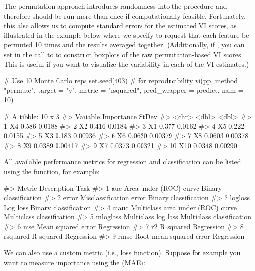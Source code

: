 The permutation approach introduces randomness into the procedure and therefore should be run more than once if computationally feasible. Fortunately, this also allows us to compute standard errors for the estimated VI scores, as illustrated in the example below where we specify  to request that each feature be permuted 10 times and the results averaged together. (Additionally, if , you can set  in the call to  to construct boxplots of the raw permutation-based VI scores. This is useful if you want to visualize the variability in each of the VI estimates.)

\begin{example}
# Use 10 Monte Carlo reps
set.seed(403)  # for reproducibility
vi(pp, method = "permute", target = "y", metric = "rsquared",
   pred_wrapper = predict, nsim = 10)

# A tibble: 10 x 3
#>    Variable Importance   StDev
#>    <chr>         <dbl>   <dbl>
#>  1 X4           0.586  0.0188 
#>  2 X2           0.416  0.0184 
#>  3 X1           0.377  0.0162 
#>  4 X5           0.222  0.0155 
#>  5 X3           0.183  0.00936
#>  6 X6           0.0620 0.00379
#>  7 X8           0.0603 0.00378
#>  8 X9           0.0389 0.00417
#>  9 X7           0.0373 0.00321
#> 10 X10          0.0348 0.00290
\end{example}

All available performance metrics for regression and classification can be listed using the  function, for example:

\begin{example}
#>     Metric                       Description                      Task
#> 1      auc            Area under (ROC) curve     Binary classification
#> 2    error           Misclassification error     Binary classification
#> 3  logloss                          Log loss     Binary classification
#> 4     mauc Multiclass area under (ROC) curve Multiclass classification
#> 5 mlogloss               Multiclass log loss Multiclass classification
#> 6      mse                Mean squared error                Regression
#> 7       r2                         R squared                Regression
#> 8 rsquared                         R squared                Regression
#> 9     rmse           Root mean squared error                Regression
\end{example}

We can also use a custom metric (i.e., loss function). Suppose for example you want to measure importance using the  (MAE): 

